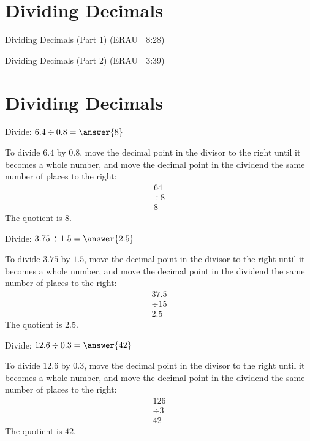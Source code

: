 \documentclass{ximera}
\begin{document}

\section*{Dividing Decimals}

Dividing Decimals (Part 1) (ERAU | 8:28)


Dividing Decimals (Part 2) (ERAU | 3:39)



\section*{Dividing Decimals}

\begin{problem}
Divide: $6.4 \div 0.8 = \answer{8}$
\begin{feedback}
To divide $6.4$ by $0.8$, move the decimal point in the divisor to the right until it becomes a whole number, and move the decimal point in the dividend the same number of places to the right:
\begin{align*}
  64 \\
\div 8 \\
\hline
  8
\end{align*}
The quotient is $8$.
\end{feedback}
\end{problem}

\begin{problem}
Divide: $3.75 \div 1.5 = \answer{2.5}$
\begin{feedback}
To divide $3.75$ by $1.5$, move the decimal point in the divisor to the right until it becomes a whole number, and move the decimal point in the dividend the same number of places to the right:
\begin{align*}
  37.5 \\
\div 15 \\
\hline
  2.5
\end{align*}
The quotient is $2.5$.
\end{feedback}
\end{problem}

\begin{problem}
Divide: $12.6 \div 0.3 = \answer{42}$
\begin{feedback}
To divide $12.6$ by $0.3$, move the decimal point in the divisor to the right until it becomes a whole number, and move the decimal point in the dividend the same number of places to the right:
\begin{align*}
  126 \\
\div 3 \\
\hline
  42
\end{align*}
The quotient is $42$.
\end{feedback}
\end{problem}
\end{document}
